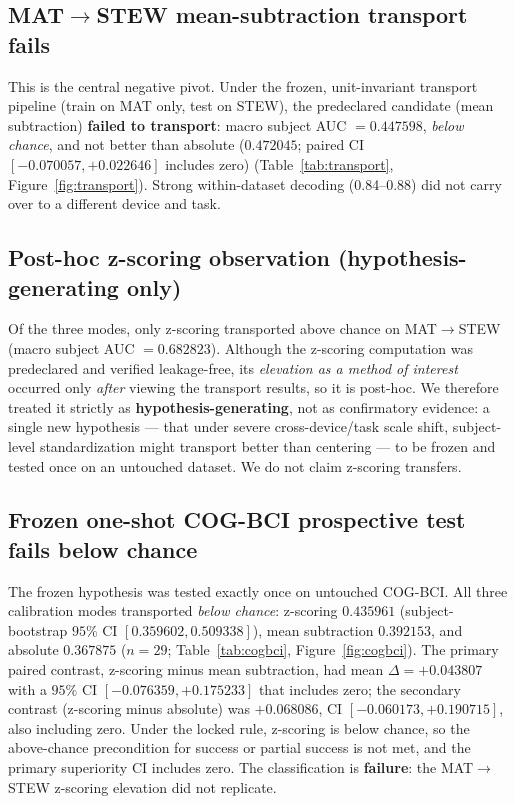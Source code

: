 \documentclass[11pt]{article}
\begin{document}
\subsection{MAT$\rightarrow$STEW mean-subtraction transport fails}

This is the central negative pivot. Under the frozen, unit-invariant transport
pipeline (train on MAT only, test on STEW), the predeclared candidate (mean
subtraction) \textbf{failed to transport}: macro subject AUC $= 0.447598$,
\textit{below chance}, and not better than absolute ($0.472045$; paired CI
$[-0.070057, +0.022646]$ includes zero) (Table~\ref{tab:transport},
Figure~\ref{fig:transport}). Strong within-dataset decoding (0.84--0.88) did not
carry over to a different device and task.

\subsection{Post-hoc z-scoring observation (hypothesis-generating only)}

Of the three modes, only z-scoring transported above chance on
MAT$\rightarrow$STEW (macro subject AUC $= 0.682823$). Although the z-scoring
computation was predeclared and verified leakage-free, its
\textit{elevation as a method of interest} occurred only \textit{after} viewing
the transport results, so it is post-hoc. We therefore treated it strictly as
\textbf{hypothesis-generating}, not as confirmatory evidence: a single new
hypothesis --- that under severe cross-device/task scale shift, subject-level
standardization might transport better than centering --- to be frozen and
tested once on an untouched dataset. We do not claim z-scoring transfers.

\subsection{Frozen one-shot COG-BCI prospective test fails below chance}

The frozen hypothesis was tested exactly once on untouched COG-BCI. All three
calibration modes transported \textit{below chance}: z-scoring $0.435961$
(subject-bootstrap $95\%$ CI $[0.359602, 0.509338]$), mean subtraction
$0.392153$, and absolute $0.367875$ ($n = 29$; Table~\ref{tab:cogbci},
Figure~\ref{fig:cogbci}). The primary paired contrast, z-scoring minus mean
subtraction, had mean $\Delta = +0.043807$ with a $95\%$ CI
$[-0.076359, +0.175233]$ that includes zero; the secondary contrast (z-scoring
minus absolute) was $+0.068086$, CI $[-0.060173, +0.190715]$, also including
zero. Under the locked rule, z-scoring is below chance, so the above-chance
precondition for success or partial success is not met, and the primary
superiority CI includes zero. The classification is \textbf{failure}: the
MAT$\rightarrow$STEW z-scoring elevation did not replicate.
\end{document}
